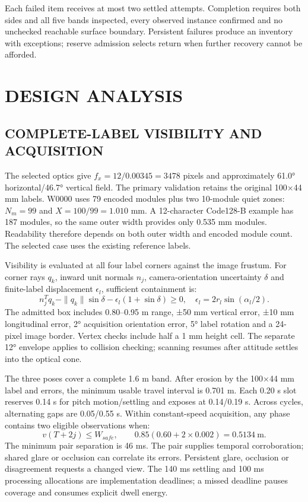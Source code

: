 \documentclass[a4paper,11pt]{article}
\begin{document}
Each failed item receives at most two settled attempts. Completion requires both sides and all five bands inspected, every observed instance confirmed and no unchecked reachable surface boundary. Persistent failures produce an inventory with exceptions; reserve admission selects return when further recovery cannot be afforded.

\section{D{\fontsize{11.2}{14}\selectfont ESIGN} A{\fontsize{11.2}{14}\selectfont NALYSIS}}
\subsection{C{\fontsize{9.2}{14}\selectfont OMPLETE}-{\fontsize{9.2}{14}\selectfont LABEL} {\fontsize{9.2}{14}\selectfont VISIBILITY} {\fontsize{9.2}{14}\selectfont AND} {\fontsize{9.2}{14}\selectfont ACQUISITION}}
The selected optics give $f_x=12/0.00345=3478$ pixels and approximately 61.0° horizontal/46.7° vertical field. The primary validation retains the original 100×44 mm labels. W0000 uses 79 encoded modules plus two 10-module quiet zones: $N_m=99$ and $X=100/99=1.010$ mm. A 12-character Code128-B example has 187 modules, so the same outer width provides only 0.535 mm modules. Readability therefore depends on both outer width and encoded module count. The selected case uses the existing reference labels.

Visibility is evaluated at all four label corners against the image frustum. For corner rays $q_k$, inward unit normals $n_j$, camera-orientation uncertainty $\delta$ and finite-label displacement $\epsilon_l$, sufficient containment is:
\begin{equation}n_j^T q_k-\|q_k\|\sin\delta-\epsilon_l(1+\sin\delta)\ge0,\quad \epsilon_l=2r_l\sin(\alpha_l/2).\end{equation}
The admitted box includes 0.80–0.95 m range, ±50 mm vertical error, ±10 mm longitudinal error, 2° acquisition orientation error, 5° label rotation and a 24-pixel image border. Vertex checks include half a 1 mm height cell. The separate 12° envelope applies to collision checking; scanning resumes after attitude settles into the optical cone.

The three poses cover a complete 1.6 m band. After erosion by the 100×44 mm label and errors, the minimum usable travel interval is 0.701 m. Each 0.20 s slot reserves 0.14 s for pitch motion/settling and exposes at 0.14/0.19 s. Across cycles, alternating gaps are 0.05/0.55 s. Within constant-speed acquisition, any phase contains two eligible observations when:
\begin{equation}v(T+2j)\le W_{safe},\qquad 0.85(0.60+2\times0.002)=0.5134\ \mathrm{m}.\end{equation}
The minimum pair separation is 46 ms. The pair supplies temporal corroboration; shared glare or occlusion can correlate its errors. Persistent glare, occlusion or disagreement requests a changed view. The 140 ms settling and 100 ms processing allocations are implementation deadlines; a missed deadline pauses coverage and consumes explicit dwell energy.
\end{document}
